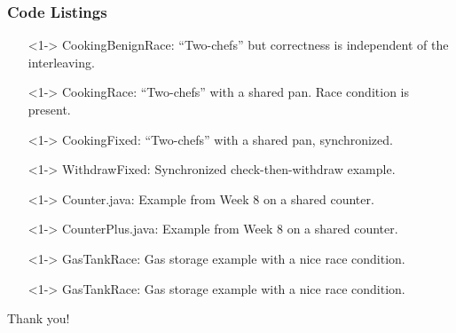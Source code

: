 \documentclass[xcolor={dvipsnames,svgnames},aspectratio=169]{beamer}
\begin{document}
\begin{frame}[fragile]
  \frametitle{Code Listings}

  \begin{itemize}
  \item[\faCode]<1-> CookingBenignRace: ``Two-chefs'' but correctness is
    independent of the interleaving.
  \item[\faCode]<1-> CookingRace: ``Two-chefs'' with a shared
    pan. Race condition is present.
  \item[\faCode]<1-> CookingFixed: ``Two-chefs'' with a shared pan, synchronized.
  \item[\faCode]<1-> WithdrawFixed: Synchronized check-then-withdraw example.
  \item[\faCode]<1-> Counter.java: Example from Week 8 on a shared counter.
  \item[\faCode]<1-> CounterPlus.java: Example from Week 8 on a shared counter.
  \item[\faCode]<1-> GasTankRace: Gas storage example with a nice race
    condition.
  \item[\faCode]<1-> GasTankRace: Gas storage example with a nice race condition.
  \end{itemize}
\end{frame}

\begin{frame}{}
  \centering \huge
  Thank you!
\end{frame}
\end{document}
